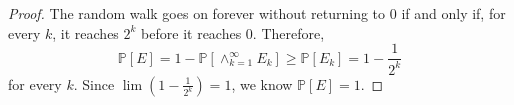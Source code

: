 \documentclass[12pt]{article}
\newcommand{\N}{\mathbb{N}}
\newcommand{\p}{\mathbb{P}}
\begin{document}
\begin{enumerate}[leftmargin=0cm,itemindent=.5cm,labelwidth=\itemindent,labelsep=0cm,align=left]
\begin{proof}
The random walk goes on forever without returning to $0$ if and only if, for every $k$, it reaches $2^k$ before it reaches $0$.  Therefore,
$$
\p[E] = 1 - \p[\land_{k=1}^\infty E_k] \geq \p[E_k] = 1 - \frac{1}{2^k}
$$
for every $k$.  Since $\lim (1 - \frac{1}{2^k}) = 1$, we know $\p[E] = 1$.

\begin{comment}
This definition enables us to calculate the probability of eventually returning to 0:
\begin{align}
\p[E] &= \p[X_n = 0 \text{ for some } n] = 1 - \p[\land_{k=1}^\infty \left( \forall n \leq k \ X_n \neq 0 \right)]
\\
& \geq 1 - \p[\land_{k=1}^\infty \left(\text{either } X_n = k \text{ before } X_n = 0 \text{, or } X_n \text{ never reaches } 0 \text{ or } k \text{ after } n=0 \right)]
\\
&= 1 - \p[\land_{k=1}^\infty \left( X_n = k \text{ before } X_n = 0 \right)]
\\
&= 1 - 0 = 1.
\end{align}
I will justify the steps given above.  The first two steps should be clear, but to express them more formally, ``$X_n = k$ before $X_n = 0$" means that, if $a = \min\{n > 0: X_n = k\}$ and $b = \min\{n >0 : X_n = 0 \}$, then $a < b$.

The third step follows from the fact that $\p[X_n \text{ never reaches } 0 \text{ or } k \text{ after } n=0] = 0$.  This we can show as follows.  One simple way for $X_n$ to reach $0$ or $k$ after time $n=0$ is for the walk to take $k$ successive steps to the right in a row.  The probability of this happening, in a fixed interval of $k$ steps, is $\frac{1}{2^k}$.  Let us consider each non-overlapping sequence of $k$ successive steps in the random walk to be a single trial.  If those $k$ steps are in the same direction, then we succeed; otherwise, we fail.  Therefore, the number of such trials $T$ until our first success has a geometric distribution, i.e.
$$
\p[T = t] = \left( 1-\frac{1}{2^k} \right)^{t-1}\left( \frac{1}{2^k} \right).
$$
This gives us
\begin{align*}
\p[\exists t\in\N : \ T = t] &= \sum_{t=1}^\infty \p[T=t]
\\
&= \sum_{t=1}^\infty \left( 1-\frac{1}{2^k} \right)^{t-1}\left( \frac{1}{2^k} \right)
\\
&= \left( \frac{1}{2^k} \right)\sum_{t=0}^\infty \left( 1-\frac{1}{2^k} \right)^{t}
\\
&= \left( \frac{1}{2^k} \right)\left(\frac{1}{1 - (1 - \frac{1}{2^k})}\right)
\\
&= 1.
\end{align*}
Therefore, the probability that the walker eventually takes $k$ successive steps to the right is $1$; so he must eventually reach either $0$ or $k$, whether by this method or another.


\end{comment}
\end{proof}
\end{enumerate}
\end{document}
